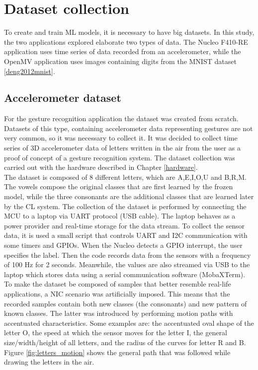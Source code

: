 \documentclass[12pt]{report}
\begin{document}
\section{Dataset collection}
To create and train ML models, it is necessary to have big datasets. In this study, the two applications explored elaborate two types of data. The Nucleo F410-RE application uses time series of data recorded from an accelerometer, while the OpenMV application uses images containing digits from the MNIST dataset \ref{deng2012mnist}. \\

\subsection{Accelerometer dataset}
For the gesture recognition application the dataset was created from scratch. Datasets of this type, containing accelerometer data representing gestures are not very common, so it was necessary to collect it. It was decided to collect time series of 3D accelerometer data of letters written in the air from the user as a proof of concept of a gesture recognition system.
The dataset collection was carried out with the hardware described in Chapter \ref{hardware}. \\
The dataset is composed of 8 different letters, which are A,E,I,O,U and B,R,M. The vowels compose the original classes that are first learned by the frozen model, while the three consonants are the additional classes that are learned later by the CL system. The collection of the dataset is performed by connecting the MCU to a laptop via UART protocol (USB cable). The laptop behaves as a power provider and real-time storage for the data stream. 
To collect the sensor data, it is used a small script that controls UART and I2C communication with some timers and GPIOs. When the Nucleo detects a GPIO interrupt, the user specifies the label. Then the code records data from the sensors with a frequency of 100 Hz for 2 seconds. Meanwhile, the values are also streamed via USB to the laptop which stores data using a serial communication software (MobaXTerm). \\
To make the dataset be composed of samples that better resemble real-life applications, a NIC scenario was artificially imposed. This means that the recorded samples contain both new classes (the consonants) and new pattern of known classes. The latter was introduced by performing motion paths with accentuated characteristics. Some examples are: the accentuated oval shape of the letter O, the speed at which the sensor moves for the letter I, the general size/width/height of all letters, and the radius of the curves for letter R and B.
Figure \ref{fig:letters_motion} shows the general path that was followed while drawing the letters in the air.\\
\end{document}
